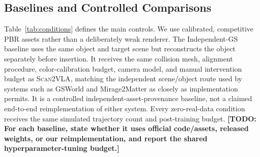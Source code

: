 \documentclass[letterpaper,10pt,conference]{ieeeconf}
\newcommand{\system}{\textsc{Scan2VLA}}
\newcommand{\todo}[1]{\textbf{[TODO: #1]}}
\begin{document}
\subsection{Baselines and Controlled Comparisons}
\begin{table}[t]
  \caption{Controlled adaptation conditions. All post-trained conditions share
  starting VLA weights, trajectories, action labels, trainable parameters,
  optimizer budget, collision geometry, physical parameters, camera protocol,
  initial-state distribution, and frozen target-robot execution stack.}
  \label{tab:conditions}
  \centering
  \small
\end{table}

Table~\ref{tab:conditions} defines the main controls. We use calibrated, competitive
PBR assets rather than a deliberately weak renderer. The Independent-GS
baseline uses the same object and target scene but reconstructs the object
separately before insertion. It receives the same collision mesh, alignment
procedure, color-calibration budget, camera model, and manual intervention
budget as \system{}, matching the independent scene/object route used by systems
such as GSWorld and Mirage2Matter as closely as implementation permits. It is a
controlled independent-asset-provenance baseline, not a claimed end-to-end
reimplementation of either system. Every zero-real-data condition receives the
same simulated trajectory count and post-training budget. \todo{For each
baseline, state whether it uses official code/assets, released weights, or our
reimplementation, and report the shared hyperparameter-tuning budget.}
\end{document}
